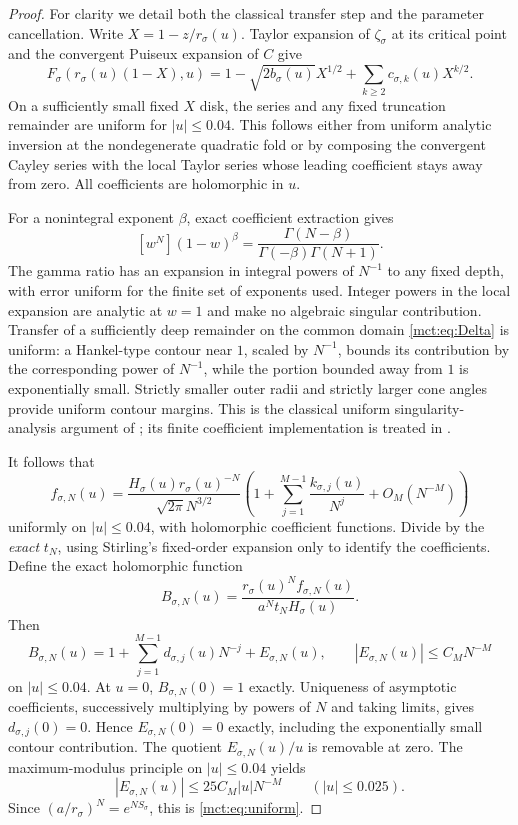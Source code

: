 \documentclass[11pt]{article}
\theoremstyle{definition}
\newcommand{\Cay}{C}
\begin{document}
\begin{proof}
For clarity we detail both the classical transfer step and the parameter cancellation. Write $X=1-z/r_\sigma(u)$. Taylor expansion of $\zeta_\sigma$ at its critical point and the convergent Puiseux expansion of $\Cay$ give
\[
 F_\sigma(r_\sigma(u)(1-X),u)
 =1-\sqrt{2b_\sigma(u)}X^{1/2}+\sum_{k\ge2}c_{\sigma,k}(u)X^{k/2}.
\]
On a sufficiently small fixed $X$ disk, the series and any fixed truncation remainder are uniform for $|u|\le0.04$. This follows either from uniform analytic inversion at the nondegenerate quadratic fold or by composing the convergent Cayley series with the local Taylor series whose leading coefficient stays away from zero. All coefficients are holomorphic in $u$.

For a nonintegral exponent $\beta$, exact coefficient extraction gives
\begin{equation}\label{mct:eq:transfergamma}
 [w^N](1-w)^\beta
 =\frac{\Gamma(N-\beta)}{\Gamma(-\beta)\Gamma(N+1)}.
\end{equation}
The gamma ratio has an expansion in integral powers of $N^{-1}$ to any fixed depth, with error uniform for the finite set of exponents used. Integer powers in the local expansion are analytic at $w=1$ and make no algebraic singular contribution. Transfer of a sufficiently deep remainder on the common domain \eqref{mct:eq:Delta} is uniform: a Hankel-type contour near $1$, scaled by $N^{-1}$, bounds its contribution by the corresponding power of $N^{-1}$, while the portion bounded away from $1$ is exponentially small. Strictly smaller outer radii and strictly larger cone angles provide uniform contour margins. This is the classical uniform singularity-analysis argument of \cite[Lemma IX.2]{fs}; its finite coefficient implementation is treated in \cite{genitrini}.

It follows that
\[
 f_{\sigma,N}(u)=\frac{H_\sigma(u)r_\sigma(u)^{-N}}{\sqrt{2\pi}N^{3/2}}
 \left(1+\sum_{j=1}^{M-1}\frac{k_{\sigma,j}(u)}{N^j}
                  +O_M(N^{-M})\right)
\]
uniformly on $|u|\le0.04$, with holomorphic coefficient functions. Divide by the \emph{exact} $t_N$, using Stirling's fixed-order expansion only to identify the coefficients. Define the exact holomorphic function
\begin{equation}\label{mct:eq:BN}
 B_{\sigma,N}(u)=
 \frac{r_\sigma(u)^N f_{\sigma,N}(u)}{a^N t_N H_\sigma(u)}.
\end{equation}
Then
\[
 B_{\sigma,N}(u)=1+\sum_{j=1}^{M-1}d_{\sigma,j}(u)N^{-j}+E_{\sigma,N}(u),
 \qquad |E_{\sigma,N}(u)|\le C_MN^{-M}
\]
on $|u|\le0.04$. At $u=0$, $B_{\sigma,N}(0)=1$ exactly. Uniqueness of asymptotic coefficients, successively multiplying by powers of $N$ and taking limits, gives $d_{\sigma,j}(0)=0$. Hence $E_{\sigma,N}(0)=0$ exactly, including the exponentially small contour contribution. The quotient $E_{\sigma,N}(u)/u$ is removable at zero. The maximum-modulus principle on $|u|\le0.04$ yields
\[
 |E_{\sigma,N}(u)|\le25C_M|u|N^{-M}\qquad(|u|\le0.025).
\]
Since $(a/r_\sigma)^N=e^{NS_\sigma}$, this is \eqref{mct:eq:uniform}.
\end{proof}
\end{document}
